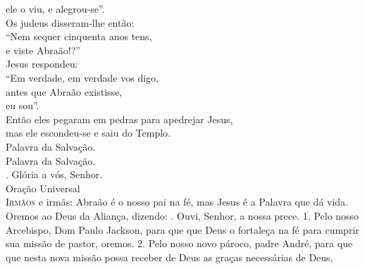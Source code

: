 \documentclass{book}
\begin{document}
\begin{flushleft}
    ele o viu, e alegrou-se''. \\
    Os judeus disseram-lhe então: \\
    ``Nem sequer cinquenta anos tens, \\
    e viste Abraão!?'' \\
    Jesus respondeu: \\
    ``Em verdade, em verdade vos digo, \\
    antes que Abraão existisse, \\
    eu sou''. \\
    Então eles pegaram em pedras para apedrejar Jesus, \\
    mas ele escondeu-se e saiu do Templo. \\
    Palavra da Salvação.
    \vspace{.2cm} \\
    Palavra da Salvação. \\
    {\color{VioletRed2} \Rbar.} Glória a vós, Senhor.
    \vspace{.2cm} \\
    \textcolor{VioletRed2}{Oração Universal}
    \vspace{.2cm} \\
    \lettrine[findent=2pt]{\color{VioletRed2}I}{rmãos} e irmãs:
    \newline
    Abraão é o nosso pai na fé,
    \newline
    mas Jesus é a Palavra que dá vida.
    \newline
    Oremos ao Deus da Aliança, dizendo:
    \vspace{.2cm}
    \newline
    {\color{VioletRed2} \Rbar.} Ouvi, Senhor, a nossa prece.
    \vspace{.2cm}
    \newline
    {\color{VioletRed2} 1.} Pelo nosso Arcebispo, Dom Paulo Jackson,
    \newline
    para que que Deus o fortaleça na fé
    \newline
    para cumprir sua missão de pastor,
    \newline
    oremos.
    \vspace{.2cm}
    \newline
    {\color{VioletRed2} 2.} Pelo nosso novo pároco, padre André,
    \newline
    para que que nesta nova missão
    \newline
    possa receber de Deus as graças necessárias de Deus,
    \newline

\end{flushleft}
\end{document}
